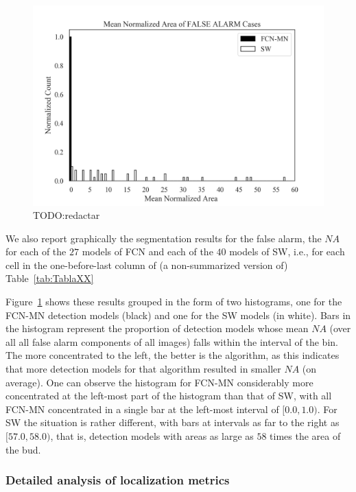 \documentclass[a4paper,authoryear,review]{elsarticle}
\begin{document}

\begin{figure}%
	\centering
	\includegraphics[width=\textwidth]{figures/AAA_mean_relative_area_fcn_vs_sw.png}%
	\caption{TODO:redactar}
	\label{fig:AAA}
\end{figure}

We also report graphically the segmentation results for the false alarm, the $NA$  for each of the $27$ models of FCN and each of the $40$ models of SW, i.e., for each cell in the  one-before-last column of (a non-summarized version of) Table~\ref{tab:TablaXX}
%

Figure~\ref{fig:AAA} shows these results grouped in the form of two histograms, one for the FCN-MN detection models (black) and one for the SW models (in white). Bars in the histogram represent the proportion of detection models whose mean $NA$ (over all all false alarm components of all images) falls within the interval of the bin. The more concentrated to the left, the better is the algorithm, as this indicates that more detection models for that algorithm resulted in smaller $NA$ (on average).
%
One can observe the histogram for FCN-MN considerably more concentrated at the left-most part of the histogram than that of SW, with all FCN-MN concentrated in a single bar at the left-most interval of  $[0.0, 1.0)$. For SW the situation is rather different, with bars at intervals as far to the right as $[57.0, 58.0)$, that is, detection models with areas as large as $58$ times the area of the bud. 
%


\subsubsection{Detailed analysis of localization metrics}
\end{document}
